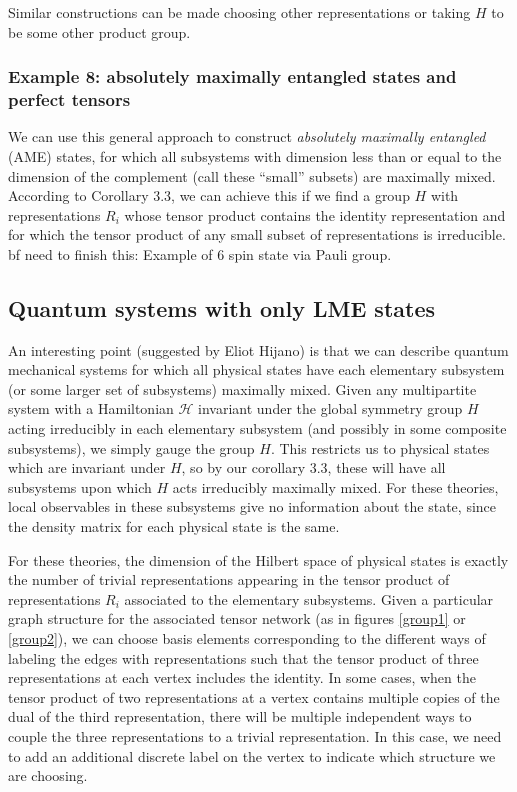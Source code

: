 \documentclass[12pt]{article}
\theoremstyle{definition}
\begin{document}
Similar constructions can be made choosing other representations or taking $H$ to be some other product group.

\subsubsection*{Example 8: absolutely maximally entangled states and perfect tensors}

We can use this general approach to construct {\it absolutely maximally entangled} (AME) states, for which all subsystems with dimension less than or equal to the dimension of the complement (call these ``small'' subsets) are maximally mixed. According to Corollary 3.3, we can achieve this if we find a group $H$ with representations $R_i$ whose tensor product contains the identity representation and for which the tensor product of any small subset of representations is irreducible. {bf need to finish this: Example of 6 spin state via Pauli group}.

\subsection{Quantum systems with only LME states}

An interesting point (suggested by Eliot Hijano) is that we can describe quantum mechanical systems for which all physical states have each elementary subsystem (or some larger set of subsystems) maximally mixed. Given any multipartite system with a Hamiltonian ${\mathcal H}$ invariant under the global symmetry group $H$ acting irreducibly in each elementary subsystem (and possibly in some composite subsystems), we simply gauge the group $H$. This restricts us to physical states which are invariant under $H$, so by our corollary 3.3, these will have all subsystems upon which $H$ acts irreducibly maximally mixed. For these theories, local observables in these subsystems give no information about the state, since the density matrix for each physical state is the same.

For these theories, the dimension of the Hilbert space of physical states is exactly the number of trivial representations appearing in the tensor product of representations $R_i$ associated to the elementary subsystems. Given a particular graph structure for the associated tensor network (as in figures \ref{group1} or \ref{group2}), we can choose basis elements corresponding to the different ways of labeling the edges with representations such that the tensor product of three representations at each vertex includes the identity. In some cases, when the tensor product of two representations at a vertex contains multiple copies of the dual of the third representation, there will be multiple independent ways to couple the three representations to a trivial representation. In this case, we need to add an additional discrete label on the vertex to indicate which structure we are choosing.
\end{document}
